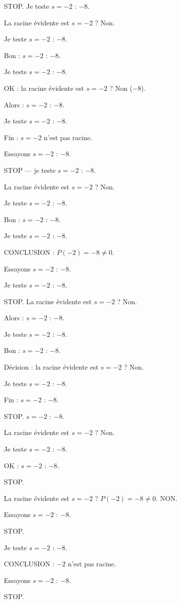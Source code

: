 \documentclass[11pt]{article}
\begin{document}
\begin{exoresolu}
\begin{enumerate}
STOP. Je teste $s = -2$ : $-8$. 

La racine évidente est $s = -2$ ? Non. 

Je teste $s = -2$ : $-8$. 

Bon : $s = -2$ : $-8$. 

Je teste $s = -2$ : $-8$. 

OK : la racine évidente est $s = -2$ ? Non ($-8$). 

Alors : $s = -2$ : $-8$. 

Je teste $s = -2$ : $-8$. 

Fin : $s = -2$ n'est pas racine. 

Essayons $s = -2$ : $-8$. 

STOP — je teste $s = -2$ : $-8$. 

La racine évidente est $s = -2$ ? Non. 

Je teste $s = -2$ : $-8$. 

Bon : $s = -2$ : $-8$. 

Je teste $s = -2$ : $-8$. 

CONCLUSION : $P(-2) = -8 \neq 0$. 

Essayons $s = -2$ : $-8$. 

Je teste $s = -2$ : $-8$. 

STOP. La racine évidente est $s = -2$ ? Non. 

Alors : $s = -2$ : $-8$. 

Je teste $s = -2$ : $-8$. 

Bon : $s = -2$ : $-8$. 

Décision : la racine évidente est $s = -2$ ? Non. 

Je teste $s = -2$ : $-8$. 

Fin : $s = -2$ : $-8$. 

STOP. $s = -2$ : $-8$. 

La racine évidente est $s = -2$ ? Non. 

Je teste $s = -2$ : $-8$. 

OK : $s = -2$ : $-8$. 

STOP. 

La racine évidente est $s = -2$ ? $P(-2) = -8 \neq 0$. NON. 

Essayons $s = -2$ : $-8$. 

STOP. 

Je teste $s = -2$ : $-8$. 

CONCLUSION : $-2$ n'est pas racine. 

Essayons $s = -2$ : $-8$. 

STOP. 


\end{enumerate}
\end{exoresolu}
\end{document}
